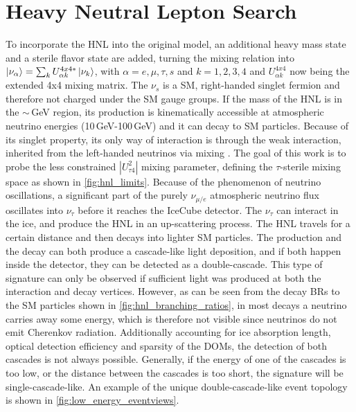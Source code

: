 \documentclass[a4paper,11pt]{article}
\begin{document}
\vspace{-0.4cm}
\section{Heavy Neutral Lepton Search}

To incorporate the HNL into the original model, an additional heavy mass state and a sterile flavor state are added, turning the mixing relation into $\ket{\nu_\alpha} = \sum_kU^{4x4*}_{\alpha k}\ket{\nu_k}$, with $\alpha=e,\mu,\tau,s$ and $k=1,2,3,4$ and $U^{4x4}_{\alpha k}$ now being the extended 4x4 mixing matrix. The $\nu_s$ is a SM, right-handed singlet fermion and therefore not charged under the SM gauge groups. If the mass of the HNL is in the $\sim$\,GeV region, its production is kinematically accessible at atmospheric neutrino energies (10\,GeV-100\,GeV) and it can decay to SM particles. Because of its singlet property, its only way of interaction is through the weak interaction, inherited from the left-handed neutrinos via mixing \cite{Coloma:2020lgy}. The goal of this work is to probe the less constrained $|U_{\tau4}^2|$ mixing parameter, defining the $\tau$-sterile mixing space as shown in \cref{fig:hnl_limits}. Because of the phenomenon of neutrino oscillations, a significant part of the purely $\nu_{\mu/e}$ atmospheric neutrino flux oscillates into $\nu_\tau$ before it reaches the IceCube detector. The $\nu_\tau$ can interact in the ice, and produce the HNL in an up-scattering process. The HNL travels for a certain distance and then decays into lighter SM particles. The production and the decay can both produce a cascade-like light deposition, and if both happen inside the detector, they can be detected as a double-cascade. This type of signature can only be observed if sufficient light was produced at both the interaction and decay vertices. However, as can be seen from the decay BRs to the SM particles shown in \cref{fig:hnl_branching_ratios}, in most decays a neutrino carries away some energy, which is therefore not visible since neutrinos do not emit Cherenkov radiation. Additionally accounting for ice absorption length, optical detection efficiency and sparsity of the DOMs, the detection of both cascades is not always possible. Generally, if the energy of one of the cascades is too low, or the distance between the cascades is too short, the signature will be single-cascade-like. An example of the unique double-cascade-like event topology is shown in \cref{fig:low_energy_eventviews}.
\end{document}
